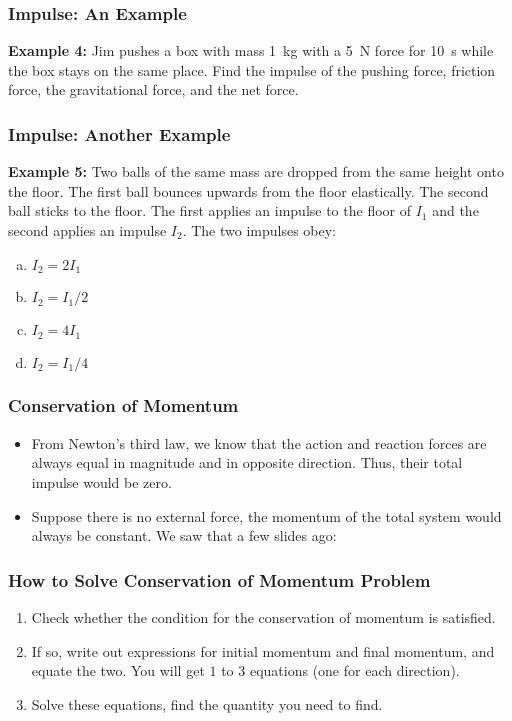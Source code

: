 \documentclass[12pt,compress,aspectratio=169]{beamer}
\newcommand{\mb}[1]{\ensuremath\mathbf{#1}}
\newcommand{\eq}[2]{\vspace{#1}{\Large\begin{displaymath}#2\end{displaymath}}}
\begin{document}
\begin{frame}
  \frametitle{Impulse: An Example}
  \textbf{Example 4:} Jim pushes a box with mass \SI{1}{kg} with a \SI{5}{N}
  force for \SI{10}{\s} while the box stays on the same place. Find the impulse
  of the pushing force, friction force, the gravitational force, and the net
  force.
\end{frame}

\begin{frame}
  \frametitle{Impulse: Another Example}
  \textbf{Example 5:} Two balls of the same mass are dropped from the same
  height onto the floor. The first ball bounces upwards from the floor
  elastically. The second ball sticks to the floor. The first applies an
  impulse to the floor of $I_1$ and the second applies an impulse $I_2$. The
  two impulses obey:
  \begin{enumerate}[(a)]
  \item $I_2=2I_1$
  \item $I_2=I_1/2$
  \item $I_2=4I_1$
  \item $I_2=I_1/4$
  \end{enumerate}
\end{frame}

\begin{frame}
  \frametitle{Conservation of Momentum}
  \begin{itemize}
  \item From Newton's third law, we know that the action and reaction forces are
    always equal in magnitude and in opposite direction. Thus, their total
    impulse would be zero. 
    
  \item Suppose there is no external force, the momentum of the total system
    would always be constant. We saw that a few slides ago:

    \eq{-.2in}{
      \sum\mb{p}(t_1)=\sum\mb{p}(t_2)
    }
  \end{itemize}
\end{frame}

\begin{frame}
  \frametitle{How to Solve Conservation of Momentum Problem}
  \begin{enumerate}
  \item Check whether the condition for the conservation of momentum is
    satisfied.
  \item If so, write out expressions for initial momentum and final momentum,
    and equate the two. You will get $1$ to $3$ equations (one for each
    direction).
  \item Solve these equations, find the quantity you need to find.
  \end{enumerate}
\end{frame}
\end{document}
